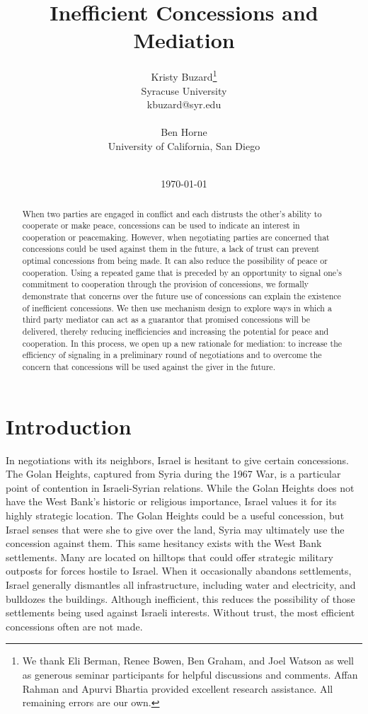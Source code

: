 \documentclass[12pt, letterpaper]{article}
\title{Inefficient Concessions and Mediation}
\author{Kristy Buzard\footnote{We thank Eli Berman, Renee Bowen, Ben Graham, and Joel Watson as well as generous seminar
participants for helpful discussions and comments. Affan Rahman and Apurvi Bhartia provided excellent research assistance. All remaining errors are our own.}\\
Syracuse University \\
kbuzard@syr.edu\\
\\
Ben Horne\\ 
University of California, San Diego\\
\\}
\date{\today}
\begin{document}
\maketitle

\begin{abstract}
When two parties are engaged in conflict and each distrusts the other's ability to cooperate or make peace, concessions can be used to indicate an interest in cooperation or peacemaking. However, when negotiating parties are concerned that concessions could be used against them in the future, a lack of trust can prevent optimal concessions from being made. It can also reduce the possibility of peace or cooperation. Using a repeated game that is preceded by an opportunity to signal one's commitment to cooperation through the provision of concessions, we formally demonstrate that concerns over the future use of concessions can explain the existence of inefficient concessions. We then use mechanism design to explore ways in which a third party mediator can act as a guarantor that promised concessions will be delivered, thereby reducing inefficiencies and increasing the potential for peace and cooperation. In this process, we open up a new rationale for mediation: to increase the efficiency of signaling in a preliminary round of negotiations and to overcome the concern that concessions will be used against the giver in the future. 
\end{abstract}



\section{Introduction} 

In negotiations with its neighbors, Israel is hesitant to give certain concessions. The Golan Heights, captured from Syria during the 1967 War, is a particular point of contention in Israeli-Syrian relations. While the Golan Heights does not have the West Bank’s historic or religious importance, Israel values it for its highly strategic location. The Golan Heights could be a useful concession, but Israel senses that were she to give over the land, Syria may ultimately use the concession against them. This same hesitancy exists with the West Bank settlements. Many are located on hilltops that could offer strategic military outposts for forces hostile to Israel. When it occasionally abandons settlements, Israel generally dismantles all infrastructure, including water and electricity, and bulldozes the buildings. Although inefficient, this reduces the possibility of those settlements being used against Israeli interests. Without trust, the most efficient concessions often are not made.
\end{document}

